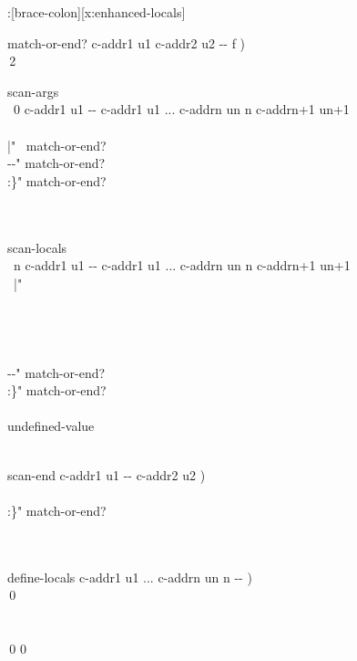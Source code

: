 \begin{worddef*}[b:]{}{\brace:}[brace-colon][x:enhanced-locals]
\begin{implement}
\word{:} match-or-end?  c-addr1 u1 c-addr2 u2 -{}- f ) \\
\tab\,2        \word{;}

\word{:} scan-args \\
\tab\, 0 c-addr1 u1 -{}- c-addr1 u1 ... c-addrn un n c-addrn+1 un+1\\
\tab\, \\
\tab[2]	  |"   ~match-or-end?   \\
\tab[2]	  -{}-" match-or-end?   \\
\tab[2]	  :\}"  match-or-end?   \\
\tab[2]	   \\
\tab\,    \word{;}

\word{:} scan-locals \\
\tab\, n c-addr1 u1 -{}- c-addr1 u1 ... c-addrn un n c-addrn+1 un+1 \\
\tab\,  |"     \\
\tab[2]	 \\
\tab\, \\
\tab\,  \\
\tab\, \\
\tab[2]	  -{}-" match-or-end?   \\
\tab[2]	  :\}"  match-or-end?   \\
\tab[2]	   \\
\tab[2]	 undefined-value \\
\tab\,   \word{;}

\word{:} scan-end  c-addr1 u1 -{}- c-addr2 u2 ) \\
\tab\, \\
\tab[2]	  :\}" match-or-end?   \\
\tab[2]	  \\
\tab\, \word{;}

\word{:} define-locals  c-addr1 u1 ... c-addrn un n -{}- ) \\
\tab\,0  \\
\tab[2]	 \\
\tab\, \\
\tab\,0 0  \word{;}


\end{implement}
\end{worddef*}
